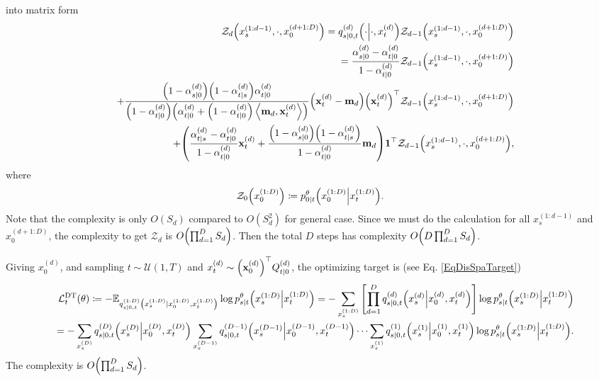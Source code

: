 \documentclass[10pt]{article}
\begin{document}
into matrix form
\begin{eqnarray*}
  &&\mathcal{Z}_d\qty(x^{(1:d-1)}_s, \cdot, x^{(d+1:D)}_0) = q_{s|0,t}^{(d)}\qty(\cdot\middle|\cdot, x_t^{(d)})\mathcal{Z}_{d-1}\qty(x_s^{(1:d-1)},\cdot,x_0^{(d+1:D)})\\
  &&=\frac{\alpha^{(d)}_{s|0}-\alpha^{(d)}_{t|0}}{1-\alpha^{(d)}_{t|0}} \mathcal{Z}_{d-1}\qty(x_s^{(1:d-1)},\cdot,x_0^{(d+1:D)})\\
  && + \frac{\qty(1-\alpha^{(d)}_{s|0})\qty(1-\alpha^{(d)}_{t|s})\alpha^{(d)}_{t|0}}{\qty(1-\alpha^{(d)}_{t|0})\qty(\alpha^{(d)}_{t|0}+\qty(1-\alpha^{(d)}_{t|0})\left\langle\mathbf{m}_d, \mathbf{x}^{(d)}_t\right\rangle)}\qty(\mathbf{x}^{(d)}_t - \mathbf{m}_d)\qty(\mathbf{x}^{(d)}_t)^\top\mathcal{Z}_{d-1}\qty(x_s^{(1:d-1)},\cdot,x_0^{(d+1:D)})\\
  && + \qty(\frac{\alpha^{(d)}_{t|s}-\alpha^{(d)}_{t|0}}{1-\alpha^{(d)}_{t|0}}\mathbf{x}^{(d)}_t + \frac{\qty(1-\alpha^{(d)}_{s|0})\qty(1-\alpha^{(d)}_{t|s})}{1-\alpha^{(d)}_{t|0}}\mathbf{m}_d)\mathbf{1}^\top\mathcal{Z}_{d-1}\qty(x_s^{(1:d-1)},\cdot,x_0^{(d+1:D)}),
\end{eqnarray*}
where
\begin{eqnarray*}
  \mathcal{Z}_0\qty(x_0^{(1:D)})\coloneq p^\theta_{0|t}\qty(x_0^{(1:D)}\middle|x_t^{(1:D)}).
\end{eqnarray*}
Note that the complexity is only $O(S_d)$ compared to $O(S_d^2)$ for general case. Since we must do the calculation for all $x_s^{(1:d-1)}$ and $x_0^{(d+1:D)}$, the complexity to get $\mathcal{Z}_d$ is $O\qty(\prod_{d=1}^D S_d)$. Then the total $D$ steps has complexity $O\qty(D\prod_{d=1}^D S_d)$. 

Giving $x^{(d)}_0$, and sampling $t\sim\mathcal{U}(1,T)$ and $x^{(d)}_t\sim \qty(\mathbf{x}^{(d)}_0)^\top Q^{(d)}_{t|0}$, the optimizing target is (see Eq. \eqref{EqDisSpaTarget})
\begin{eqnarray*}
  &&\mathcal{L}^\text{DT}_t(\theta)\coloneq - \mathbb{E}_{q^{(1:D)}_{s|0,t}\qty(x^{(1:D)}_s|x^{(1:D)}_0, x^{(1:D)}_t)}\log p^\theta_{s|t}\qty(x_s^{(1:D)}\middle|x_t^{(1:D)})= - \sum_{x^{(1:D)}_s}\qty[\prod_{d=1}^D q^{(d)}_{s|0,t}\qty(x_s^{(d)}\middle|x_0^{(d)}, x_t^{(d)})]\log p^\theta_{s|t}\qty(x_s^{(1:D)}\middle|x_t^{(1:D)})\\
  &&= - \sum_{x_s^{(D)}}q^{(D)}_{s|0,t}\qty(x_s^{(D)}\middle|x_0^{(D)}, x_t^{(D)})\sum_{x_s^{(D-1)}}q^{(D-1)}_{s|0,t}\qty(x_s^{(D-1)}\middle|x_0^{(D-1)}, x_t^{(D-1)})\cdots\sum_{x_s^{(1)}} q^{(1)}_{s|0,t}\qty(x_s^{(1)}\middle|x_0^{(1)}, x_t^{(1)})\log p^\theta_{s|t}\qty(x_s^{(1:D)}\middle|x_t^{(1:D)}).
\end{eqnarray*}
The complexity is $O\qty(\prod_{d=1}^D S_d)$.
\end{document}
